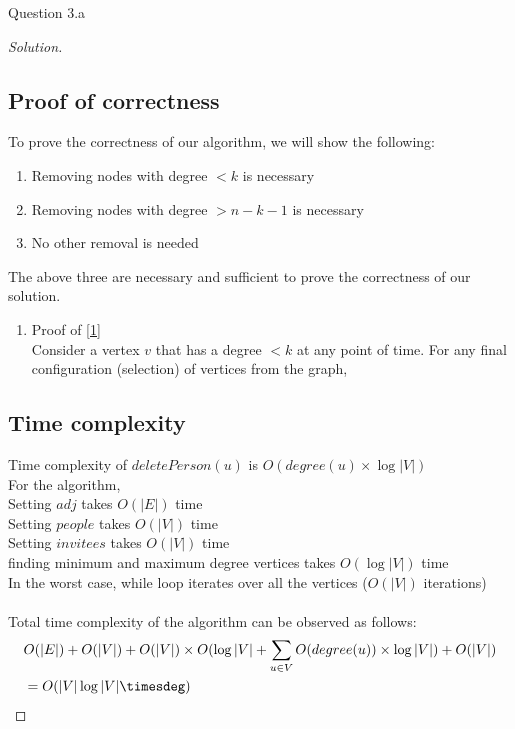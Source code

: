 \begin{solution}{Question 3.a}
\begin{proof}[Solution]
        \subsection*{Proof of correctness}
        To prove the correctness of our algorithm, we will show the following:
        \begin{enumerate}
            \item{Removing nodes with degree $<k$ is necessary}\label{1}
            \item{Removing nodes with degree $>n-k-1$ is necessary}
            \item{No other removal is needed}
        \end{enumerate}
        The above three are necessary and sufficient to prove the correctness of our solution.
        \begin{enumerate}
            \item{Proof of \ref{1}}\\
                Consider a vertex $v$ that has a degree $<k$ at any point of time. For any final configuration (selection) of vertices from the graph, 
        \end{enumerate}
        
        \subsection*{Time complexity}
        Time complexity of $deletePerson(u)$ is $O(degree(u)\times \log|V|)$ \\
        For the algorithm,\\
        Setting $adj$ takes $O(|E|)$ time\\
        Setting $people$ takes $O(|V|)$ time\\
        Setting $invitees$ takes $O(|V|)$ time\\
        finding minimum and maximum degree vertices takes $O(\log|V|)$ time\\
        In the worst case, while loop iterates over all the vertices ($O(|V|)$ iterations)\\
        \\
        Total time complexity of the algorithm can be observed as follows:
        \begin{equation}
            \begin{split}
                &O(|E|)+O(|V|)+O(|V|)\times O(\log|V|+\sum_{u\in V}O(degree(u))\times \log|V|)+O(|V|)\\
                &=O(|V|\log|V|\timesdeg)
            \end{split}
        \end{equation}
        
    \end{proof}
\end{solution}


